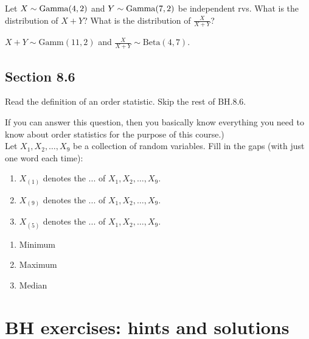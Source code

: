 \begin{exercise}
Let $X \sim \mathrm{Gamma}(4,2)$ and $Y \sim \mathrm{Gamma}(7,2)$ be independent rvs. What is the distribution of $X+Y$? What is the distribution of $\frac{X}{X+Y}$?

\begin{solution}
$X+Y \sim \text{Gamm}(11,2)$ and $\frac{X}{X+Y} \sim \text{Beta}(4,7)$.
\end{solution}
\end{exercise}





\subsection*{Section 8.6}
\label{sec:section-8.6}

Read the definition of an order statistic. Skip the rest of BH.8.6.

\begin{exercise}
If you can answer this question, then you basically know everything you need to know about order statistics for the purpose of this course.)\\
Let $X_1,X_2,\ldots,X_9$ be a collection of random variables. Fill in the gaps (with just one word each time):
\begin{enumerate}
    \item $X_{(1)}$ denotes the ... of $X_1,X_2,\ldots,X_9$.
    \item $X_{(9)}$ denotes the ... of $X_1,X_2,\ldots,X_9$.
    \item $X_{(5)}$ denotes the ... of $X_1,X_2,\ldots,X_9$.
\end{enumerate}
\begin{solution}
\begin{enumerate}
    \item Minimum
    \item Maximum
    \item Median
\end{enumerate}
\end{solution}
\end{exercise}



\section{BH exercises: hints and solutions}


